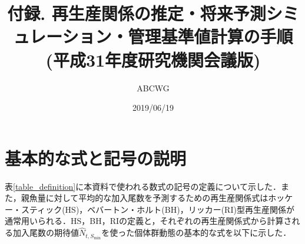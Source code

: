 \documentclass[11pt]{jsarticle}
\begin{document}
\title{付録. 再生産関係の推定・将来予測シミュレーション・管理基準値計算の手順 \\
  \Large (平成31年度研究機関会議版)
}
\author{ABCWG}
\date{2019/06/19}
\maketitle

\section{基本的な式と記号の説明}
表\ref{table_definition}に本資料で使われる数式の記号の定義について示した．また，親魚量に対して平均的な加入尾数を予測するための再生産関係式はホッケー・スティック(HS)\cite{hockey}，ベバートン・ホルト(BH)\cite{beverton}，リッカー(RI)\cite{ricker}型再生産関係が通常用いられる．HS，BH，RIの定義と，それぞれの再生産関係式から計算される加入尾数の期待値$\hat{N}_{t,S_{\mathrm{min}}}$を使った個体群動態の基本的な式を以下に示した． 
\end{document}

